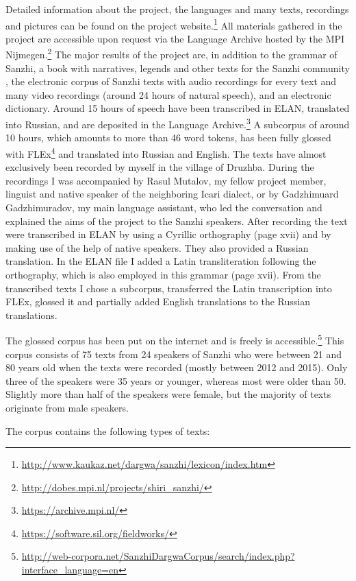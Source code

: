 \sloppy Detailed information about the project, the languages and many texts, recordings and pictures can be found on the project website.\footnote{\url{http://www.kaukaz.net/dargwa/sanzhi/lexicon/index.htm}} All materials gathered in the project are accessible upon request via the Language Archive hosted by the MPI Nijmegen.\footnote{\url{http://dobes.mpi.nl/projects/shiri_sanzhi/}} The major results of the project are, in addition to the grammar of Sanzhi, a book with narratives, legends and other texts for the Sanzhi community \citep{Forker.Gadzhimuradov2017}, the electronic corpus of Sanzhi texts with audio recordings for every text and many video recordings (around 24 hours of natural speech), and an electronic dictionary. Around 15 hours of speech have been transcribed in ELAN, translated into Russian, and are deposited in the Language Archive.\footnote{\url{https://archive.mpi.nl/}} A subcorpus of around 10 hours, which amounts to more than 46 word tokens, has been fully glossed with FLEx\footnote{\url{https://software.sil.org/fieldworks/}} and translated into Russian and English. The texts have almost exclusively been recorded by myself in the village of Druzhba. During the recordings I was accompanied by Rasul Mutalov, my fellow project member, linguist and native speaker of the neighboring Icari dialect, or by Gadzhimuard Gadzhimuradov, my main language assistant, who led the conversation and explained the aims of the project to the Sanzhi speakers. After recording the text were transcribed in ELAN by using a Cyrillic orthography (page xvii) and by making use of the help of native speakers. They also provided a Russian translation. In the ELAN file I added a Latin transliteration following the orthography, which is also employed in this grammar (page xvii). From the transcribed texts I chose a subcorpus, transferred the Latin transcription into FLEx, glossed it and partially added English translations to the Russian translations.

The glossed corpus has been put on the internet and is freely is accessible.\footnote{\url{http://web-corpora.net/SanzhiDargwaCorpus/search/index.php?interface_language=en}} This corpus consists of 75 texts from 24 speakers of Sanzhi who were between 21 and 80 years old when the texts were recorded (mostly between 2012 and 2015). Only three of the speakers were 35 years or younger, whereas most were older than 50. Slightly more than half of the speakers were female, but the majority of texts originate from male speakers.

The corpus contains the following types of texts:


